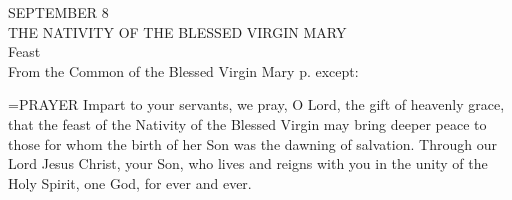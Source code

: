 \begin{center}\normalsize SEPTEMBER 8\\
\footnotesize THE NATIVITY OF THE BLESSED VIRGIN MARY\\
\footnotesize Feast\\
\footnotesize From the Common of the Blessed Virgin Mary p.    except:\\
\end{center}

\hangindent=\parindent \small{PRAYER 
Impart to your servants, we pray, O Lord,
the gift of heavenly grace,
that the feast of the Nativity of the Blessed Virgin
may bring deeper peace
to those for whom the birth of her Son
was the dawning of salvation.
Through our Lord Jesus Christ, your Son,
who lives and reigns with you in the unity of the Holy Spirit,
one God, for ever and ever.\\}
 

